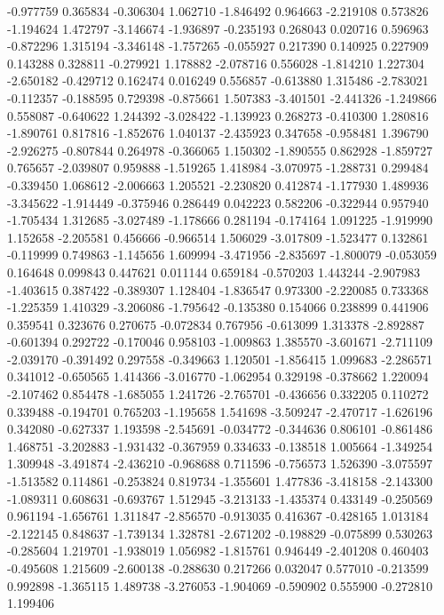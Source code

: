 -0.977759
0.365834
-0.306304
1.062710
-1.846492
0.964663
-2.219108
0.573826
-1.194624
1.472797
-3.146674
-1.936897
-0.235193
0.268043
0.020716
0.596963
-0.872296
1.315194
-3.346148
-1.757265
-0.055927
0.217390
0.140925
0.227909
0.143288
0.328811
-0.279921
1.178882
-2.078716
0.556028
-1.814210
1.227304
-2.650182
-0.429712
0.162474
0.016249
0.556857
-0.613880
1.315486
-2.783021
-0.112357
-0.188595
0.729398
-0.875661
1.507383
-3.401501
-2.441326
-1.249866
0.558087
-0.640622
1.244392
-3.028422
-1.139923
0.268273
-0.410300
1.280816
-1.890761
0.817816
-1.852676
1.040137
-2.435923
0.347658
-0.958481
1.396790
-2.926275
-0.807844
0.264978
-0.366065
1.150302
-1.890555
0.862928
-1.859727
0.765657
-2.039807
0.959888
-1.519265
1.418984
-3.070975
-1.288731
0.299484
-0.339450
1.068612
-2.006663
1.205521
-2.230820
0.412874
-1.177930
1.489936
-3.345622
-1.914449
-0.375946
0.286449
0.042223
0.582206
-0.322944
0.957940
-1.705434
1.312685
-3.027489
-1.178666
0.281194
-0.174164
1.091225
-1.919990
1.152658
-2.205581
0.456666
-0.966514
1.506029
-3.017809
-1.523477
0.132861
-0.119999
0.749863
-1.145656
1.609994
-3.471956
-2.835697
-1.800079
-0.053059
0.164648
0.099843
0.447621
0.011144
0.659184
-0.570203
1.443244
-2.907983
-1.403615
0.387422
-0.389307
1.128404
-1.836547
0.973300
-2.220085
0.733368
-1.225359
1.410329
-3.206086
-1.795642
-0.135380
0.154066
0.238899
0.441906
0.359541
0.323676
0.270675
-0.072834
0.767956
-0.613099
1.313378
-2.892887
-0.601394
0.292722
-0.170046
0.958103
-1.009863
1.385570
-3.601671
-2.711109
-2.039170
-0.391492
0.297558
-0.349663
1.120501
-1.856415
1.099683
-2.286571
0.341012
-0.650565
1.414366
-3.016770
-1.062954
0.329198
-0.378662
1.220094
-2.107462
0.854478
-1.685055
1.241726
-2.765701
-0.436656
0.332205
0.110272
0.339488
-0.194701
0.765203
-1.195658
1.541698
-3.509247
-2.470717
-1.626196
0.342080
-0.627337
1.193598
-2.545691
-0.034772
-0.344636
0.806101
-0.861486
1.468751
-3.202883
-1.931432
-0.367959
0.334633
-0.138518
1.005664
-1.349254
1.309948
-3.491874
-2.436210
-0.968688
0.711596
-0.756573
1.526390
-3.075597
-1.513582
0.114861
-0.253824
0.819734
-1.355601
1.477836
-3.418158
-2.143300
-1.089311
0.608631
-0.693767
1.512945
-3.213133
-1.435374
0.433149
-0.250569
0.961194
-1.656761
1.311847
-2.856570
-0.913035
0.416367
-0.428165
1.013184
-2.122145
0.848637
-1.739134
1.328781
-2.671202
-0.198829
-0.075899
0.530263
-0.285604
1.219701
-1.938019
1.056982
-1.815761
0.946449
-2.401208
0.460403
-0.495608
1.215609
-2.600138
-0.288630
0.217266
0.032047
0.577010
-0.213599
0.992898
-1.365115
1.489738
-3.276053
-1.904069
-0.590902
0.555900
-0.272810
1.199406
